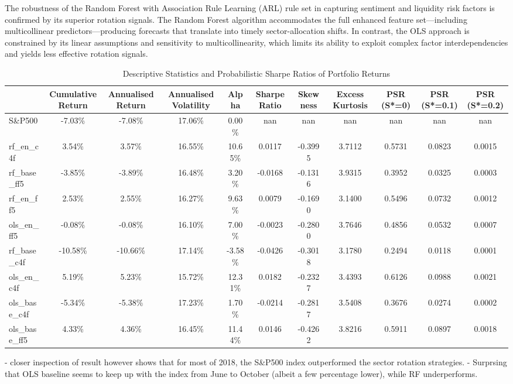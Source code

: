 The robustness of the Random Forest with Association Rule Learning (ARL) rule set in capturing sentiment and liquidity risk factors is confirmed by its superior rotation signals. The Random Forest algorithm accommodates the full enhanced feature set—including multicollinear predictors—producing forecasts that translate into timely sector-allocation shifts. In contrast, the OLS approach is constrained by its linear assumptions and sensitivity to multicollinearity, which limits its ability to exploit complex factor interdependencies and yields less effective rotation signals. 

\begin{table}[ht]
    \centering
    \caption{Descriptive Statistics and Probabilistic Sharpe Ratios of Portfolio Returns}
    \label{tab:return_stats_1}
    \begin{tabular}{lcccccccccc}
        \toprule
        {} & Cumulative Return & Annualised Return & Annualised Volatility & Alpha & Sharpe Ratio & Skewness & Excess Kurtosis & PSR (S*=0) & PSR (S*=0.1) & PSR (S*=0.2) \\
        \midrule
        S\&P500 & -7.03\% & -7.08\% & 17.06\% & 0.00\% & nan & nan & nan & nan & nan & nan \\
        rf\_en\_c4f & 3.54\% & 3.57\% & 16.55\% & 10.65\% & 0.0117 & -0.3995 & 3.7112 & 0.5731 & 0.0823 & 0.0015 \\
        rf\_base\_ff5 & -3.85\% & -3.89\% & 16.48\% & 3.20\% & -0.0168 & -0.1316 & 3.9315 & 0.3952 & 0.0325 & 0.0003 \\
        rf\_en\_ff5 & 2.53\% & 2.55\% & 16.27\% & 9.63\% & 0.0079 & -0.1690 & 3.1400 & 0.5496 & 0.0732 & 0.0012 \\
        ols\_en\_ff5 & -0.08\% & -0.08\% & 16.10\% & 7.00\% & -0.0023 & -0.2800 & 3.7646 & 0.4856 & 0.0532 & 0.0007 \\
        rf\_base\_c4f & -10.58\% & -10.66\% & 17.14\% & -3.58\% & -0.0426 & -0.3018 & 3.1780 & 0.2494 & 0.0118 & 0.0001 \\
        ols\_en\_c4f & 5.19\% & 5.23\% & 15.72\% & 12.31\% & 0.0182 & -0.2327 & 3.4393 & 0.6126 & 0.0988 & 0.0021 \\
        ols\_base\_c4f & -5.34\% & -5.38\% & 17.23\% & 1.70\% & -0.0214 & -0.2817 & 3.5408 & 0.3676 & 0.0274 & 0.0002 \\
        ols\_base\_ff5 & 4.33\% & 4.36\% & 16.45\% & 11.44\% & 0.0146 & -0.4262 & 3.8216 & 0.5911 & 0.0897 & 0.0018 \\
        \bottomrule
    \end{tabular}
\end{table}

- closer inspection of result however shows that for most of 2018, the S\&P500 index outperformed the sector rotation strategies.
- Surprsing that OLS baseline seems to keep up with the index from June to October (albeit a few percentage lower), while RF underperforms.


